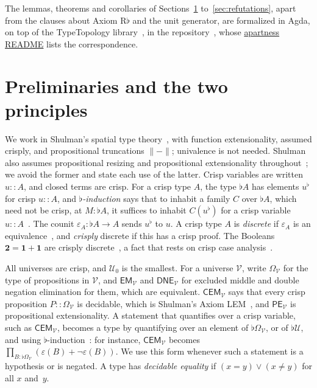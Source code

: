 \documentclass[11pt]{amsart}
\theoremstyle{definition}
\theoremstyle{remark}
\newcommand{\U}{\mathcal U}
\newcommand{\V}{\mathcal V}
\newcommand{\Uz}{\mathcal U_0}
\newcommand{\B}{\mathbf 2}
\newcommand{\one}{\mathbf 1}
\newcommand{\Om}{\Omega}
\newcommand{\crisp}{\mathrel{::}}
\newcommand{\cu}{\varepsilon}
\newcommand{\fl}[1]{{#1}^{\flat}}
\newcommand{\trunc}[1]{\lVert #1\rVert}
\newcommand{\EM}{\mathsf{EM}}
\newcommand{\DNE}{\mathsf{DNE}}
\newcommand{\CEM}{\mathsf{CEM}}
\newcommand{\PE}{\mathsf{PE}}
\begin{document}
The lemmas, theorems and corollaries of Sections~\ref{sec:prelim}
to~\ref{sec:refutations}, apart from the clauses about Axiom R$\flat$ and
the unit generator, are formalized in Agda, on top of the TypeTopology
library~\cite{TypeTopology}, in the repository~\cite{Formalization},
whose \href{https://github.com/zwanzigerc/cohesion/blob/171714333d2c480a273e3b37293a4a7fc2655526/apartness/README.md\#results-and-agda-names}{apartness README} lists the correspondence.

\section{Preliminaries and the two principles}\label{sec:prelim}

We work in Shulman's spatial type theory~\cite[\S\S2--6]{Shulman2018},
with function extensionality, assumed crisply, and propositional
truncations $\trunc{-}$; univalence is not needed. Shulman also assumes
propositional resizing and propositional extensionality
throughout~\cite[\S1]{Shulman2018}; we avoid the former and state each
use of the latter. Crisp variables are written $u\crisp A$, and closed
terms are crisp. For a crisp type $A$, the type $\flat A$ has elements
$\fl u$ for crisp $u\crisp A$, and \emph{$\flat$-induction} says that to
inhabit a family $C$ over $\flat A$, which need not be crisp, at
$M:\flat A$, it suffices to inhabit $C(\fl u)$ for a crisp variable
$u\crisp A$~\cite[\S4.2]{Shulman2018}. The counit $\cu_A:\flat A\to A$
sends $\fl u$ to $u$. A crisp type $A$ is \emph{discrete} if $\cu_A$ is
an equivalence~\cite[Definition~6.12]{Shulman2018}, and \emph{crisply}
discrete if this has a crisp proof. The Booleans $\B=\one+\one$ are
crisply discrete~\cite[Theorems~6.19 and~6.21]{Shulman2018}, a fact that
rests on crisp case analysis~\cite[Theorem~5.4]{Shulman2018}.

All universes are crisp, and $\Uz$ is the smallest. For a universe
$\V$, write $\Om_\V$ for the type of propositions in $\V$, and $\EM_\V$
and $\DNE_\V$ for excluded middle and double negation elimination for
them, which are equivalent. $\CEM_\V$ says
that every crisp proposition $P\crisp\Om_\V$ is decidable, which is
Shulman's Axiom LEM~\cite[\S2.1]{Shulman2018}, and $\PE_\V$ is
propositional extensionality. A statement that quantifies over a crisp
variable, such as $\CEM_\V$, becomes a type by quantifying over an
element of $\flat\Om_\V$, or of $\flat\U$, and using
$\flat$-induction~\cite[Remarks~6.28 and~8.1]{Shulman2018}: for instance,
$\CEM_\V$ becomes $\prod_{B:\flat\Om_\V}(\cu(B)+\neg\cu(B))$. We use this
form whenever such a statement is a hypothesis or is negated. A type has
\emph{decidable equality} if $(x=y)\vee(x\neq y)$ for all $x$ and~$y$.
\end{document}
